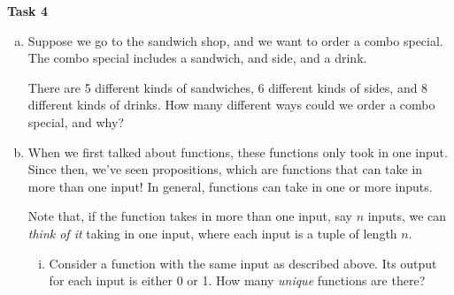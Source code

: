 \documentclass[12pt,letterpaper]{article}
\newif\ifsol
\newcommand{\solu}[2]{ \begin{mdframed} \ifsol #2 \else \vspace{#1} \fi \end{mdframed} }
\begin{document}
  \textbf{Task 4}
  \begin{enumerate}[a.]
      \item Suppose we go to the sandwich shop, and we want to order a combo special. The combo special includes a sandwich, and side, and a drink.
      
      There are 5 different kinds of sandwiches, 6 different kinds of sides, and 8 different kinds of drinks. How many different ways could we order a combo special, and why?
      
      \solu{4 cm}{240. We let $A$ be the set of sandwiches, $B$ be the set of sides, and $C$ be the set of drinks. Then $A \times B \times C$ has all of the different ways we could order, and there are $5\cdot 6 \cdot 8=240$ elements in this Cartesian product.}
      
      \item When we first talked about functions, these functions only took in one input. Since then, we've seen propositions, which are functions that can take in more than one input! In general, functions can take in one or more inputs. 
      
      Note that, if the function takes in more than one input, say $n$ inputs, we can \textit{think of it} taking in one input, where each input is a tuple of length $n$.
      \begin{enumerate}[i.]

        \item Consider a function with the same input as described above. Its output for each input is either 0 or 1. How many \textit{unique} functions are there?
        

\end{enumerate}
\end{enumerate}
\end{document}
